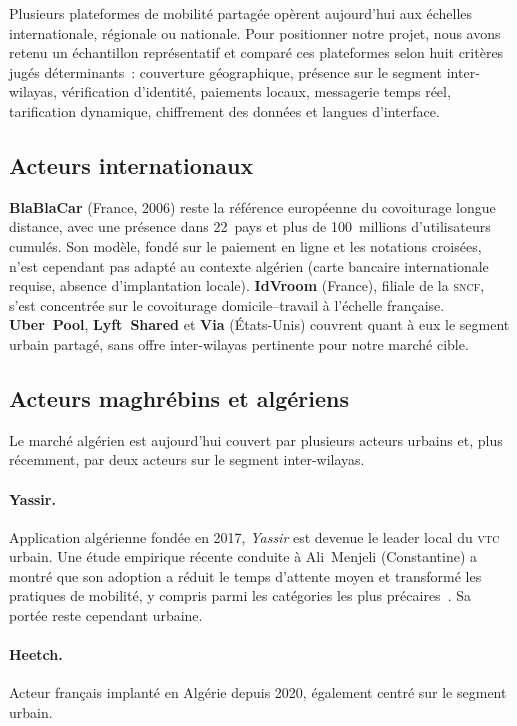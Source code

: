 \documentclass[12pt, a4paper, oneside]{report}
\begin{document}
Plusieurs plateformes de mobilité partagée opèrent aujourd'hui aux échelles internationale, régionale ou nationale. Pour positionner notre projet, nous avons retenu un échantillon représentatif et comparé ces plateformes selon huit critères jugés déterminants~: couverture géographique, présence sur le segment inter-wilayas, vérification d'identité, paiements locaux, messagerie temps réel, tarification dynamique, chiffrement des données et langues d'interface.

\subsection{Acteurs internationaux}

\textbf{BlaBlaCar} (France, 2006) reste la référence européenne du covoiturage longue distance, avec une présence dans 22~pays et plus de 100~millions d'utilisateurs cumulés. Son modèle, fondé sur le paiement en ligne et les notations croisées, n'est cependant pas adapté au contexte algérien (carte bancaire internationale requise, absence d'implantation locale). \textbf{IdVroom} (France), filiale de la \textsc{sncf}, s'est concentrée sur le covoiturage domicile--travail à l'échelle française. \textbf{Uber~Pool}, \textbf{Lyft~Shared} et \textbf{Via} (États-Unis) couvrent quant à eux le segment urbain partagé, sans offre inter-wilayas pertinente pour notre marché cible.

\subsection{Acteurs maghrébins et algériens}

Le marché algérien est aujourd'hui couvert par plusieurs acteurs urbains et, plus récemment, par deux acteurs sur le segment inter-wilayas.

\paragraph{Yassir.} Application algérienne fondée en 2017, \textit{Yassir} est devenue le leader local du \textsc{vtc} urbain. Une étude empirique récente conduite à Ali~Menjeli (Constantine) a montré que son adoption a réduit le temps d'attente moyen et transformé les pratiques de mobilité, y compris parmi les catégories les plus précaires~\cite{naim_yassir_2024}. Sa portée reste cependant urbaine.

\paragraph{Heetch.} Acteur français implanté en Algérie depuis 2020, également centré sur le segment urbain.
\end{document}
